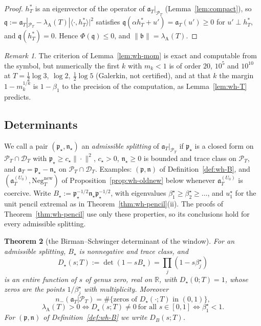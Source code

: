 \documentclass[11pt]{amsart}
\newtheorem{theorem}{Theorem}[section]
\theoremstyle{definition}
\theoremstyle{remark}
\newtheorem{remark}[theorem]{Remark}
\newcommand{\R}{\mathbb R}
\newcommand{\PT}{\mathcal P_T}
\newcommand{\lamA}{\lambda_{\mathrm A}(T)}
\begin{document}
\begin{proof}
$h^*_T$ is an eigenvector of the operator of $\mathfrak a_T|_{\PT}$ (Lemma~\ref{lem:compact}), so
$\mathfrak q:=\mathfrak a_T|_{\PT}-\lamA|\langle\cdot,h^*_T\rangle|^2$ satisfies $\mathfrak q(\alpha h^*_T+u')=\mathfrak a_T(u')\ge0$ for
$u'\perp h^*_T$, and $\mathfrak q(h^*_T)=0$. Hence $\Phi(\mathfrak q)\le0$, and $\|\mathfrak b\|=\lamA$.
\end{proof}

\begin{remark}\label{rem:wh-mom}
The criterion of Lemma~\ref{lem:wh-mom} is exact and computable from the symbol, but numerically the first $k$
with $m_k<1$ is of order $20$, $10^5$ and $10^{10}$ at $T=\frac12\log3,\ \log2,\ \frac12\log5$ (Galerkin, not
certified), and at that $k$ the margin $1-m_k^{1/k}$ is $1-\beta_1$ to the precision of the computation, as
Lemma~\ref{lem:wh-T} predicts.
\end{remark}

\subsection{Determinants}\label{subsec:wh-det}

We call a pair $(\mathfrak p_\star,\mathfrak n_\star)$ an \emph{admissible splitting} of $\mathfrak a_T|_{\PT}$ if $\mathfrak p_\star$ is a closed
form on $\PT\cap\mathcal D_T$ with $\mathfrak p_\star\ge c_\star\|\cdot\|^2$, $c_\star>0$, $\mathfrak n_\star\ge0$ is bounded and trace class
on $\PT$, and $\mathfrak a_T=\mathfrak p_\star-\mathfrak n_\star$ on $\PT\cap\mathcal D_T$. Examples: $(\mathfrak p,\mathfrak n)$ of
Definition~\ref{def:wh-B}, and $(\mathfrak a^{(U_0)}_T,\mathrm{Neg}^{\mathrm{new}}_T)$ of Proposition~\ref{prop:wh-oldnew} below
whenever $\mathfrak a^{(U_0)}_T$ is coercive. Write $B_\star:=\mathfrak p_\star^{-1/2}\mathfrak n_\star\mathfrak p_\star^{-1/2}$, with eigenvalues
$\beta^\star_1\ge\beta^\star_2\ge\dots$, and $u^\star_1$ for the unit pencil extremal as in
Theorem~\ref{thm:wh-pencil}(ii). The proofs of Theorem~\ref{thm:wh-pencil} use only these properties, so its
conclusions hold for every admissible splitting.

\begin{theorem}[the Birman--Schwinger determinant of the window]\label{thm:wh-det}
For an admissible splitting, $B_\star$ is nonnegative and trace class, and
\[
D_\star(s;T):=\det(1-sB_\star)=\prod_j(1-s\beta^\star_j)
\]
is an entire function of $s$ of genus zero, real on $\R$, with $D_\star(0;T)=1$, whose zeros are the points
$1/\beta^\star_j$ with multiplicity. Moreover
\[
n_-(\mathfrak a_T|\PT)=\#\{\text{zeros of }D_\star(\cdot;T)\text{ in }(0,1)\},
\]
\[
\lamA>0\iff D_\star(s;T)\ne0\ \text{for all }s\in[0,1]\iff\beta^\star_1<1 .
\]
For $(\mathfrak p,\mathfrak n)$ of Definition~\ref{def:wh-B} we write $D_B(s;T)$.
\end{theorem}
\end{document}
